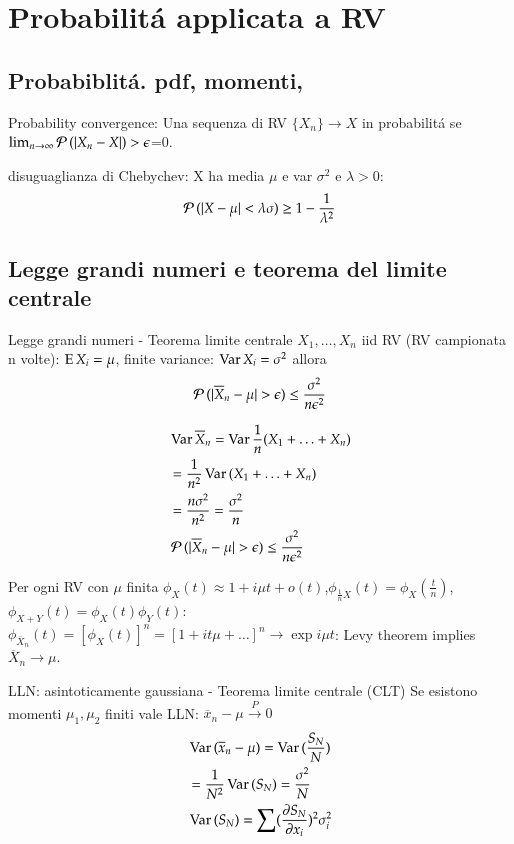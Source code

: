 \documentclass[main.tex]{subfiles}
\begin{document}
\chapter{Probabilit\'a applicata a RV}
\PartialToc

\section{Probabiblit\'a. pdf, momenti, }

Probability convergence: Una sequenza di RV $\{X_n\}\to X$ in probabilit\'a se $\lim_{n\to\infty}\prob{(|X_n-X|)>\epsilon}$=0.

disuguaglianza di Chebychev: X ha media $\mu$ e var $\sigma^2$ e $\lambda>0$:
\[\prob{(|X-\mu|<\lambda\sigma)}\geq1-\frac{1}{\lambda^2}\]

\section{Legge grandi numeri e teorema del limite centrale}


Legge grandi numeri - Teorema limite centrale
$X_1,\ldots,X_n$ iid RV (RV campionata n volte): $\E{X_i}=\mu$, finite variance: $\var{X_i}=\sigma^2$ allora \[\prob{(|\overline{X}_n-\mu|>\epsilon)}\leq\frac{\sigma^2}{n\epsilon^2}\]

\begin{align*}
&\var{\overline{X}_n}=\var{\frac{1}{n}(X_1+\ldots+X_n)}\\
&=\frac{1}{n^2}\var{(X_1+\ldots+X_n)}\\
&=\frac{n\sigma^2}{n^2}=\frac{\sigma^2}{n}\\
&\prob{(|\overline{X}_n-\mu|>\epsilon)}\leq\frac{\sigma^2}{n\epsilon^2}
\end{align*}

Per ogni RV con $\mu$ finita $\phi_X(t)\approx1+i\mu t+o(t)$,$\phi_{\frac{1}{n}X}(t)=\phi_X(\frac{t}{n})$, $\phi_{X+Y}(t)=\phi_X(t)\phi_Y(t)$:
$\phi_{\overline{X}_n}(t)=[\phi_X(t)]^n=[1+it\mu+\ldots]^n\to\exp{i\mu t}$: Levy theorem implies $\overline{X}_n\to\mu$.

LLN: asintoticamente gaussiana - Teorema limite centrale (CLT)
Se esistono momenti $\mu_1, \mu_2$ finiti vale LLN: $\overline{x}_n-\mu\xrightarrow{P}0$
\begin{align*}
&\var{(\overline{x}_n-\mu)}=\var{(\frac{S_N}{N})}\\
&=\frac{1}{N^2}\var{(S_N)}=\frac{\sigma^2}{N}\\
&\var{(S_N)}=\sum(\PDy{x_i}{S_N})^2\sigma_i^2
\end{align*}
\end{document}
